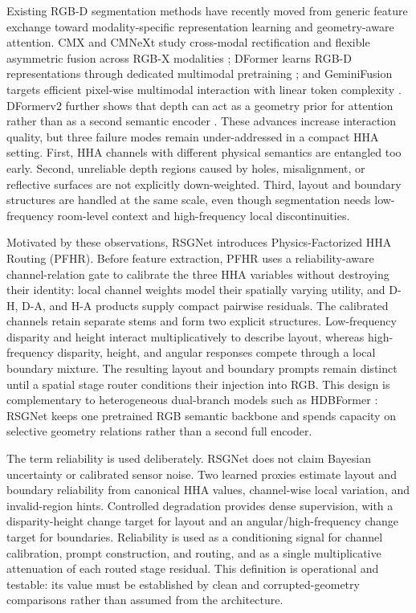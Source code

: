 \documentclass[a4paper,fleqn]{cas-dc}
\begin{document}
Existing RGB-D segmentation methods have recently moved from generic feature exchange toward modality-specific representation learning and geometry-aware attention. CMX and CMNeXt study cross-modal rectification and flexible asymmetric fusion across RGB-X modalities \citep{zhang2023cmx,zhang2023delivering}; DFormer learns RGB-D representations through dedicated multimodal pretraining \citep{yin2024dformer}; and GeminiFusion targets efficient pixel-wise multimodal interaction with linear token complexity \citep{ding2024geminifusion}. DFormerv2 further shows that depth can act as a geometry prior for attention rather than as a second semantic encoder \citep{yin2025dformerv2}. These advances increase interaction quality, but three failure modes remain under-addressed in a compact HHA setting. First, HHA channels with different physical semantics are entangled too early. Second, unreliable depth regions caused by holes, misalignment, or reflective surfaces are not explicitly down-weighted. Third, layout and boundary structures are handled at the same scale, even though segmentation needs low-frequency room-level context and high-frequency local discontinuities.

Motivated by these observations, RSGNet introduces Physics-Factorized HHA Routing (PFHR). Before feature extraction, PFHR uses a reliability-aware channel-relation gate to calibrate the three HHA variables without destroying their identity: local channel weights model their spatially varying utility, and D-H, D-A, and H-A products supply compact pairwise residuals. The calibrated channels retain separate stems and form two explicit structures. Low-frequency disparity and height interact multiplicatively to describe layout, whereas high-frequency disparity, height, and angular responses compete through a local boundary mixture. The resulting layout and boundary prompts remain distinct until a spatial stage router conditions their injection into RGB. This design is complementary to heterogeneous dual-branch models such as HDBFormer \citep{wei2025hdbformer}: RSGNet keeps one pretrained RGB semantic backbone and spends capacity on selective geometry relations rather than a second full encoder.

The term reliability is used deliberately. RSGNet does not claim Bayesian uncertainty or calibrated sensor noise. Two learned proxies estimate layout and boundary reliability from canonical HHA values, channel-wise local variation, and invalid-region hints. Controlled degradation provides dense supervision, with a disparity-height change target for layout and an angular/high-frequency change target for boundaries. Reliability is used as a conditioning signal for channel calibration, prompt construction, and routing, and as a single multiplicative attenuation of each routed stage residual. This definition is operational and testable: its value must be established by clean and corrupted-geometry comparisons rather than assumed from the architecture.
\end{document}

